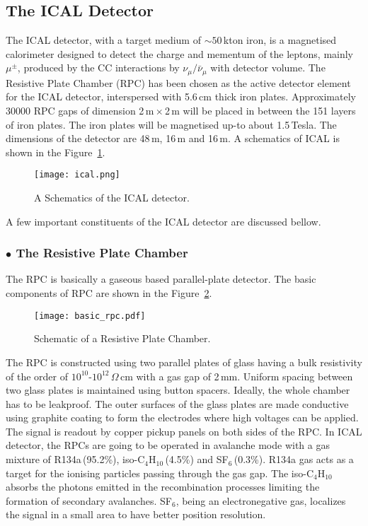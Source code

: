\subsection{The ICAL Detector}
The ICAL detector, with a target medium of $\sim 50$\,kton iron, is a
magnetised calorimeter designed to detect the charge and mementum of
the leptons, mainly $\mu^{\pm}$, produced by the CC interactions by
$\nu_{\mu}/\bar{\nu}_{\mu}$ with detector volume. The Resistive Plate
Chamber (RPC) has been chosen as the active detector element for the
ICAL detector, interspersed with 5.6\,cm thick iron plates.
Approximately 30000 RPC gaps of dimension 2\,m\,$\times$\,2\,m will
be placed in between the 151 layers of iron plates. The iron plates
will be magnetised up-to about 1.5\,Tesla. The dimensions of the
detector are 48\,m, 16\,m and 16\,m. A schematics of ICAL is shown in
the Figure~\ref{fig:icalsk}. 
\begin{figure}[h]
  \centering
  \texttt{[image: ical.png]}
  \caption{A Schematics of the ICAL detector\cite{inoreport}.}
  \label{fig:icalsk}
\end{figure}
A few important constituents of the ICAL detector are discussed bellow.

\subsubsection*{$\bullet$ The Resistive Plate Chamber}
The RPC is basically a gaseous based parallel-plate
detector\cite{rpc_p2}. The basic components of RPC are shown in the
Figure~\ref{fig:rpc}. 
\begin{figure}[h]
  \centering
  \texttt{[image: basic\_rpc.pdf]}
  \caption{Schematic of a Resistive Plate Chamber.}
  \label{fig:rpc}
\end{figure}
The RPC is constructed using two parallel plates of glass having a
bulk resistivity of the order of $10^{10}$-$10^{12}$\,$\Omega$\,cm with
a gas gap of 2\,mm. Uniform spacing between two glass plates is
maintained using button spacers. Ideally, the whole chamber has to be
leakproof. The outer surfaces of the glass plates are made conductive
using graphite coating to form the electrodes where high voltages can
be applied. The signal is readout by copper pickup panels on both
sides of the RPC. In ICAL detector, the RPCs are going to be operated
in avalanche mode with a gas mixture of R134a\,(95.2\%),
iso-C$_4$H$_{10}$\,(4.5\%) and SF$_6$\,(0.3\%). R134a gas acts as a
target for the ionising particles passing through the gas gap. The
iso-C$_4$H$_{10}$ absorbs the photons emitted in the recombination
processes limiting the formation of secondary avalanches. SF$_6$,
being an electronegative gas, localizes the signal in a small area to
have better position resolution.

